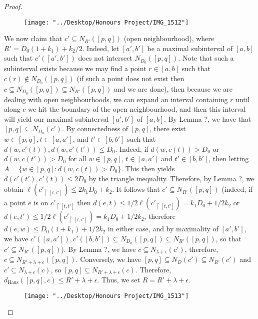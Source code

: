 \documentclass[12pt]{article}
\newcommand{\vs}{\vskip10pt}
\begin{document}
\begin{proof}
		
		\begin{figure} [h]
			\centering
			\texttt{[image: "../Desktop/Honours Project/IMG\_1512"]}
			\caption{}
			\label{fig:img1512}
		\end{figure}
	
	
		\vs 
		
		We now claim that $c' \subseteq N_{R'}([p,q])$ (open neighbourhood), where $R' = D_0 (1 + k_1) + k_2 / 2$. Indeed, let $[a', b']$ be a maximal subinterval of $[a,b]$ such that $c'([a', b'])$ does not intersect $N_{D_0}([p,q])$. Note that such a subinterval exists because we may find a point $r \in [a,b]$ such that $c(r) \notin N_{D_0}([p,q])$ (if such a point does not exist then $c \subseteq N_{D_0}([p,q]) \subseteq N_{R'}([p,q])$ and we are done), then because we are dealing with open neighbourhoods, we can expand an interval containing $r$ until along $c$ we hit the boundary of the open neighbourhood, and then this interval will yield our maximal subinterval $[a', b']$ of $[a,b]$. By Lemma ?, we have that $[p,q] \subseteq N_{D_0}(c')$. By connectedness of $[p,q]$, there exist $w \in [p,q], t \in [a, a']$, and $t' \in [b,b']$ such that $d(w,c'(t)), d(w, c'(t')) \leq D_0$. Indeed, if $d(w, c(t)) > D_0$ or $d(w, c(t')) > D_0$ for all $w \in [p,q]$, $t \in [a, a']$ and $t' \in [b, b']$, then letting $A = \{w \in [p,q] : d(w, c(t)) > D_0\}$. This then yields $d(c'(t'), c'(t)) \leq 2D_0$ by the triangle inequality. Therefore, by Lemma ?, we obtain $\ell(c'_{\restriction [t, t']}) \leq 2k_1 D_0 + k_2$. It follows that $c' \subseteq N_{R'}([p,q])$ (indeed, if a point $e$ is on $c'_{\restriction [t, t']}$ then $d(e, t) \leq 1/2 \ell(c'_{\restriction [t, t']}) = k_1 D_0 + 1/2 k_2$ or $d(e, t') \leq 1/2 \ell(c'_{\restriction [t, t']}) = k_1 D_0 + 1/2 k_2$, therefore $d(e,w) \leq D_0(1 + k_1) + 1/2 k_2$ in either case, and by maximality of $[a', b']$, we have $c'([a, a']), c'([b, b']) \subseteq N_{D_0}([p,q]) \subseteq N_{R'}([p,q])$, so that $c' \subseteq N_{R'}([p,q])$). By Lemma ?, we have $c \subseteq N_{\lambda+\epsilon} (c')$, therefore, $c \subseteq N_{R' + \lambda + \epsilon}([p,q])$. Conversely, we have $[p,q] \subseteq N_{D}(c') \subseteq N_{R'}(c')$ and $c' \subseteq N_{\lambda + \epsilon}(c)$, so $[p,q] \subseteq N_{R' + \lambda + \epsilon}(c)$. Therefore, $d_{\text{Haus}}([p,q], c) \leq R' + \lambda + \epsilon$. Thus, we set $R = R' + \lambda + \epsilon$. 
	
\begin{figure} [h]
	\centering
	\texttt{[image: "../Desktop/Honours Project/IMG\_1513"]}
	\caption{}
	\label{fig:img1513}
\end{figure}

		
	\end{proof}
	
\end{document}

